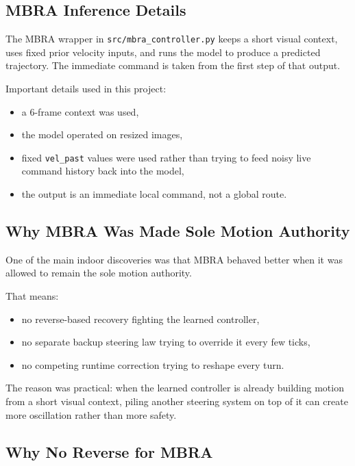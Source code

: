 \documentclass[11pt]{article}
\begin{document}
\subsection{MBRA Inference Details}

The MBRA wrapper in \texttt{src/mbra\_controller.py} keeps a short visual context,
uses fixed prior velocity inputs, and runs the model to produce a predicted
trajectory. The immediate command is taken from the first step of that output.

Important details used in this project:

\begin{itemize}[nosep]
  \item a 6-frame context was used,
  \item the model operated on resized images,
  \item fixed \texttt{vel\_past} values were used rather than trying to feed noisy
  live command history back into the model,
  \item the output is an immediate local command, not a global route.
\end{itemize}

\subsection{Why MBRA Was Made Sole Motion Authority}

One of the main indoor discoveries was that MBRA behaved better when it was allowed
to remain the sole motion authority.

That means:

\begin{itemize}[nosep]
  \item no reverse-based recovery fighting the learned controller,
  \item no separate backup steering law trying to override it every few ticks,
  \item no competing runtime correction trying to reshape every turn.
\end{itemize}

The reason was practical: when the learned controller is already building motion
from a short visual context, piling another steering system on top of it can create
more oscillation rather than more safety.

\subsection{Why No Reverse for MBRA}
\end{document}
